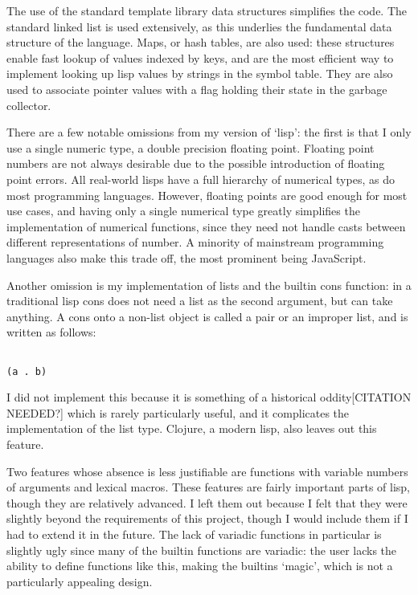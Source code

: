 \documentclass[12pt]{article}
\begin{document}
The use of the standard template library data structures simplifies the code.
The standard linked list is used extensively, as this underlies the fundamental
data structure of the language. Maps, or hash tables, are also used: these structures enable fast lookup of values indexed by keys, and are the most efficient way to implement looking up lisp values by strings in the symbol table. They are also used to associate pointer values with a flag holding their
state in the garbage collector. 

There are a few notable omissions from my version of `lisp': the first is that
I only use a single numeric type, a double precision floating point. Floating point numbers are not always desirable due to the possible introduction of floating point errors. All real-world lisps have a full hierarchy of numerical types, as do most programming languages. However, floating points are good enough for most use cases, and having only a single numerical type greatly simplifies the implementation of numerical functions, since they need not handle casts between different representations of number. A minority of
mainstream programming languages also make this trade off, the most prominent being JavaScript.

Another omission is my implementation of lists and the builtin cons function: in a traditional lisp cons does not need a list as the second argument, but can
take anything. A cons onto a non-list object is called a pair or an improper list, and is written as follows:
\begin{lstlisting}

(a . b)

\end{lstlisting}

I did not implement this because it is something of a historical oddity[CITATION NEEDED?] which is rarely particularly useful, and it complicates the implementation of the list type. Clojure, a modern lisp, also
leaves out this feature.

Two features whose absence is less justifiable are functions with variable numbers of arguments and lexical macros. These features are fairly important
parts of lisp, though they are relatively advanced. I left them out because I felt that they were slightly beyond the requirements of this project, though I would include them if I had to extend it in the future. The lack of
variadic functions in particular is slightly ugly since many of the builtin
functions are variadic: the user lacks the ability to define functions like this, making the builtins `magic', which is not a particularly appealing design.
\end{document}
